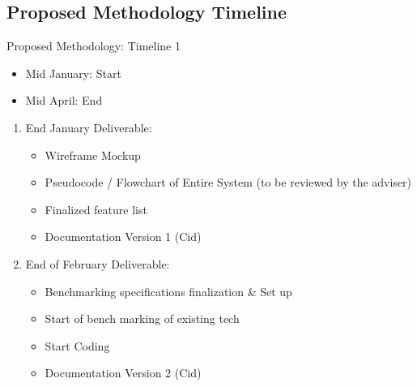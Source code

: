 \documentclass{beamer}
\begin{document}





\subsection{Proposed Methodology Timeline}
\begin{frame}{Proposed Methodology: Timeline 1}
    \begin{itemize}
        \item Mid January: Start
        \item Mid April: End
    \end{itemize}
    \begin{enumerate}
        \item End January Deliverable: 
        \begin{itemize}
            \item Wireframe Mockup
            \item Pseudocode / Flowchart of Entire System (to be reviewed by the adviser)
            \item Finalized feature list
            \item Documentation Version 1 (Cid)
        \end{itemize}
        \item End of February Deliverable:
            \begin{itemize}
                \item Benchmarking specifications finalization \& Set up
                \item Start of bench marking of existing tech
                \item Start Coding
                \item Documentation Version 2 (Cid)
            \end{itemize}
    \end{enumerate}            
            \end{frame}
\end{document}
